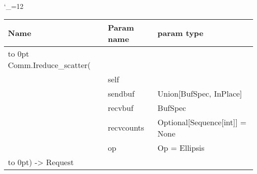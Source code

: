\begingroup \catcode`\_=12 \tt
\begin{tabular}{lll}
\toprule
\textrm{Name}&\textrm{Param name}&\textrm{param type}\\
\midrule
\hbox to 0pt {Comm.Ireduce_scatter(\hss}\\
& self\\
& sendbuf & Union[BufSpec, InPlace]\\
& recvbuf & BufSpec\\
& recvcounts & Optional[Sequence[int]] = None\\
& op & Op = Ellipsis\\
\hbox to 0pt{) -> Request\hss}\\
\bottomrule
\end{tabular}
\endgroup
